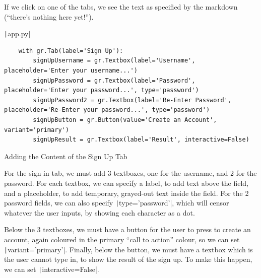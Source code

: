 \documentclass[12pt]{report}
\newcommand{\pil}[1]{\protect\texttt|#1|}
\begin{document}
If we click on one of the tabs, we see the text as specified by the markdown (``there's nothing here yet!'').

\begin{center}
\end{center}

\begin{listing}[H]
\pil{app.py}
\begin{verbatim}
    with gr.Tab(label='Sign Up'):
        signUpUsername = gr.Textbox(label='Username', placeholder='Enter your username...')
        signUpPassword = gr.Textbox(label='Password', placeholder='Enter your password...', type='password')
        signUpPassword2 = gr.Textbox(label='Re-Enter Password', placeholder='Re-Enter your password...', type='password')
        signUpButton = gr.Button(value='Create an Account', variant='primary')
        signUpResult = gr.Textbox(label='Result', interactive=False)
\end{verbatim}
\caption{Adding the Content of the Sign Up Tab}\label{cs:signUpContent}
\end{listing}

For the sign in tab, we must add 3 textboxes, one for the username, and 2 for the password. For each textbox, we can specify a label, to add text above the field, and a placeholder, to add temporary, grayed-out text inside the field. For the 2 password fields, we can also specify \pil{type='password'}, which will censor whatever the user inputs, by showing each character as a dot.

Below the 3 textboxes, we must have a button for the user to press to create an account, again coloured in the primary ``call to action'' colour, so we can set \pil{variant='primary'}. Finally, below the button, we must have a textbox which is the user cannot type in, to show the result of the sign up. To make this happen, we can set \pil{interactive=False}.
\end{document}
